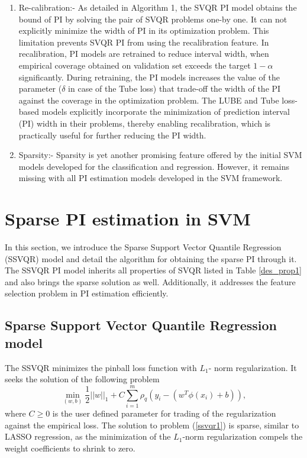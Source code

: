 \documentclass[10pt]{article} %
\begin{document}
\begin{enumerate}
     \item [(f)] Re-calibration:-  As detailed in Algorithm 1, the SVQR PI model obtains the bound of PI by solving the pair of SVQR problems one-by one. It can not explicitly minimize the width of PI in its optimization problem. This limitation prevents SVQR PI from using the recalibration feature. In recalibration, PI models are retrained to reduce interval width, when  empirical coverage obtained on validation set exceeds the target $1-\alpha$ significantly. During retraining, the PI models increases the value of the parameter ($\delta$ in case of the Tube loss) that trade-off the width of the PI against the coverage in the optimization problem. The LUBE and Tube loss-based models explicitly incorporate the minimization of prediction interval (PI) width in their problems, thereby enabling recalibration, which is practically useful for further reducing the PI width.
     \item [(g)] Sparsity:- Sparsity is yet another promising feature offered by the initial SVM models developed for the classification and regression. However, it remains missing with all PI estimation models developed in the SVM framework.
\end{enumerate}
\section{Sparse  PI estimation in SVM}		
In this section, we introduce the Sparse Support Vector Quantile Regression (SSVQR) model and detail the algorithm for obtaining the sparse PI through it. The SSVQR PI model inherits all properties of SVQR listed in Table \ref{des_prop1} and also brings the sparse solution as well.  Additionally, it addresses the feature selection problem in PI estimation efficiently.

\subsection{Sparse Support Vector Quantile Regression model}

The SSVQR minimizes the pinball loss function with $L_1$- norm regularization.  It seeks the solution of the following problem
\begin{equation}
    \min \limits_{(w,b)} \frac{1}{2} ||w||_1 + C\sum \limits_{i=1}^{m} \rho_q(y_i- (w^T\phi(x_i) +b)), \label{ssvqr1}
\end{equation}
where $C \geq 0$ is the user defined parameter for trading of the regularization against the empirical loss. The solution to problem (\ref{ssvqr1}) is sparse, similar to LASSO regression, as the minimization of the \(L_1\)-norm regularization compels the weight coefficients to shrink to zero.
\end{document}
